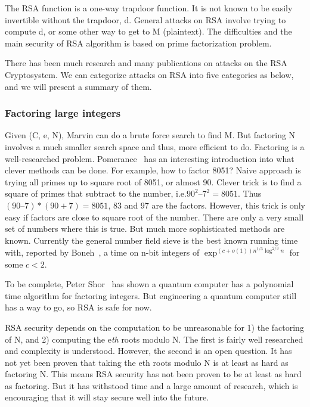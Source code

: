 \documentclass[12pt,journal,compsoc]{IEEEtran}
\begin{document}
The RSA function is a one-way trapdoor function. It is not known to be
easily invertible without the trapdoor, d. General attacks on RSA
involve trying to compute d, or some other way to get to M
(plaintext). The difficulties and the main security of RSA algorithm
is based on prime factorization problem. 
\par
There has been much research and many publications on attacks on the
RSA Cryptosystem.  We can categorize attacks on RSA into five
categories as below, and we will present a summary of them.

\subsubsection{\qquad Factoring large integers}
\label{sec:qquad-fact-large}

Given (C, e, N), Marvin can do a brute force search to find M. But
factoring N involves a much smaller search space and thus, more
efficient to do. Factoring is a well-researched
problem. Pomerance~\cite{pomerance2008tale} has an interesting
introduction into what clever methods can be done.  For example, how
to factor 8051?  Naive approach is trying all primes up to square root
of 8051, or almost 90.  Clever trick is to find a square of primes
that subtract to the number, i.e.$ 90^{2} – 7^{2} = 8051$. Thus $(90 –
7) * (90 + 7) = 8051$, $83$ and $97$ are the factors. However, this
trick is only easy if factors are close to square root of the number.
There are only a very small set of numbers where this is true.  But
much more sophisticated methods are known.  Currently the general
number field sieve is the best known running time with, reported by
Boneh~\cite{boneh1999twenty}, a time on n-bit integers of
$\exp^{(c+o(1))n^{1/3}\log^{2/3}n}$ for some $c<2$.
\par
To be complete, Peter Shor~\cite{Shor:1994jg} has shown a
quantum computer has a polynomial time algorithm for factoring
integers. But engineering a quantum computer still has a way to go, so
RSA is safe for now. 
\par
RSA security depends on the computation to be unreasonable for 1) the
factoring of N, and 2) computing the e\emph{th} roots modulo N. The first is
fairly well researched and complexity is understood. However, the
second is an open question. It has not yet been proven that taking the
eth roots modulo N is at least as hard as factoring N. This means RSA
security has not been proven to be at least as hard as factoring. But
it has withstood time and a large amount of research, which is
encouraging that it will stay secure well into the future.
\par
\end{document}
